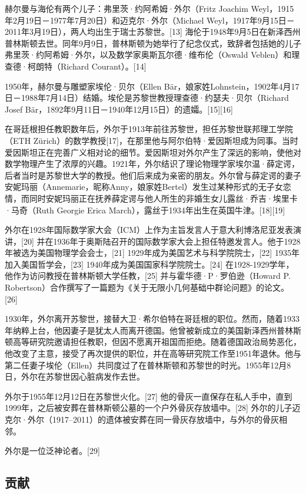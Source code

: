 赫尔曼与海伦有两个儿子：弗里茨·约阿希姆·外尔（Fritz Joachim Weyl，1915年2月19日－1977年7月20日）和迈克尔·外尔（Michael Weyl，1917年9月15日－2011年3月19日），两人均出生于瑞士苏黎世。[13] 海伦于1948年9月5日在新泽西州普林斯顿去世。同年9月9日，普林斯顿为她举行了纪念仪式，致辞者包括她的儿子弗里茨·约阿希姆·外尔，以及数学家奥斯瓦尔德·维布伦（Oswald Veblen）和理查德·柯朗特（Richard Courant）。[14]

1950年，赫尔曼与雕塑家埃伦·贝尔（Ellen Bär，娘家姓Lohnstein，1902年4月17日－1988年7月14日）结婚。埃伦是苏黎世教授理查德·约瑟夫·贝尔（Richard Josef Bär，1892年9月11日－1940年12月15日）的遗孀。[15][16]

在哥廷根担任教职数年后，外尔于1913年前往苏黎世，担任苏黎世联邦理工学院（ETH Zürich）的数学教授[17]，在那里他与阿尔伯特·爱因斯坦成为同事。当时爱因斯坦正在完善广义相对论的细节。爱因斯坦对外尔产生了深远的影响，使他对数学物理产生了浓厚的兴趣。1921年，外尔结识了理论物理学家埃尔温·薛定谔，后者当时是苏黎世大学的教授。他们后来成为亲密的朋友。外尔曾与薛定谔的妻子安妮玛丽（Annemarie，昵称Anny，娘家姓Bertel）发生过某种形式的无子女恋情，而同时安妮玛丽正在抚养薛定谔与他人所生的非婚生女儿露丝·乔吉·埃里卡·马奇（Ruth Georgie Erica March），露丝于1934年出生在英国牛津。[18][19]

外尔在1928年国际数学家大会（ICM）上作为主旨发言人于意大利博洛尼亚发表演讲，[20] 并在1936年于奥斯陆召开的国际数学家大会上担任特邀发言人。他于1928年被选为美国物理学会会士，[21] 1929年成为美国艺术与科学院院士，[22] 1935年加入美国哲学会，[23] 1940年成为美国国家科学院院士。[24] 在1928-1929学年，他作为访问教授在普林斯顿大学任教，[25] 并与霍华德·P·罗伯逊（Howard P. Robertson）合作撰写了一篇题为《关于无限小几何基础中群论问题》的论文。[26]

1930年，外尔离开苏黎世，接替大卫·希尔伯特在哥廷根的职位。然而，随着1933年纳粹上台，他因妻子是犹太人而离开德国。他曾被新成立的美国新泽西州普林斯顿高等研究院邀请担任教职，但因不愿离开祖国而拒绝。随着德国政治局势恶化，他改变了主意，接受了再次提供的职位，并在高等研究院工作至1951年退休。他与第二任妻子埃伦（Ellen）共同度过了在普林斯顿和苏黎世的时光。1955年12月8日，外尔在苏黎世因心脏病发作去世。

外尔于1955年12月12日在苏黎世火化。[27] 他的骨灰一直保存在私人手中，直到1999年，之后被安葬在普林斯顿公墓的一个户外骨灰存放墙中。[28] 外尔的儿子迈克尔·外尔（1917–2011）的遗体被安葬在同一骨灰存放墙中，与外尔的骨灰相邻。

外尔是一位泛神论者。[29]
\subsection{贡献}
